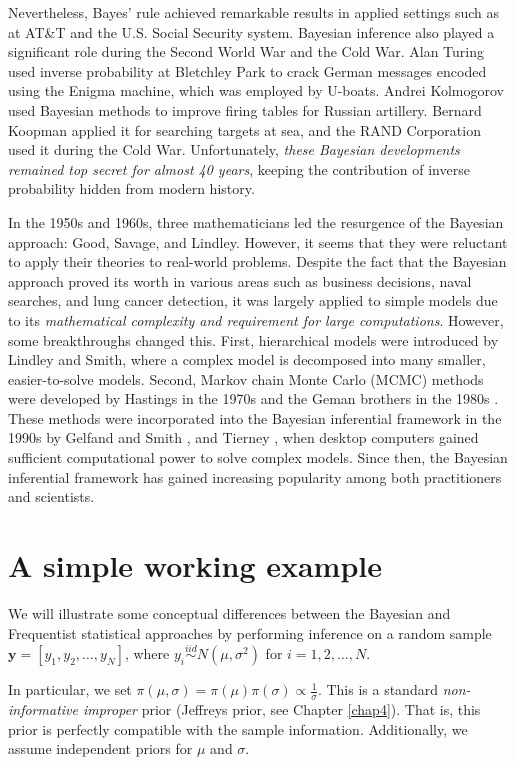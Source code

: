 Nevertheless, Bayes' rule achieved remarkable results in applied settings such as at AT\&T and the U.S. Social Security system. Bayesian inference also played a significant role during the Second World War and the Cold War. Alan Turing used inverse probability at Bletchley Park to crack German messages encoded using the Enigma machine, which was employed by U-boats. Andrei Kolmogorov used Bayesian methods to improve firing tables for Russian artillery. Bernard Koopman applied it for searching targets at sea, and the RAND Corporation used it during the Cold War. Unfortunately, \textit{these Bayesian developments remained top secret for almost 40 years}, keeping the contribution of inverse probability hidden from modern history.

In the 1950s and 1960s, three mathematicians led the resurgence of the Bayesian approach: Good, Savage, and Lindley. However, it seems that they were reluctant to apply their theories to real-world problems. Despite the fact that the Bayesian approach proved its worth in various areas such as business decisions, naval searches, and lung cancer detection, it was largely applied to simple models due to its \textit{mathematical complexity and requirement for large computations}. However, some breakthroughs changed this. First, hierarchical models were introduced by Lindley and Smith, where a complex model is decomposed into many smaller, easier-to-solve models. Second, Markov chain Monte Carlo (MCMC) methods were developed by Hastings in the 1970s \cite{hastings70} and the Geman brothers in the 1980s \cite{Geman1984}. These methods were incorporated into the Bayesian inferential framework in the 1990s by Gelfand and Smith \cite{Gelfand1990}, and Tierney \cite{tierney1994markov}, when desktop computers gained sufficient computational power to solve complex models. Since then, the Bayesian inferential framework has gained increasing popularity among both practitioners and scientists.

\section{A simple working example}\label{sec26}

We will illustrate some conceptual differences between the Bayesian and Frequentist statistical approaches by performing inference on a random sample $\mathbf{y} = [y_1, y_2, \dots, y_N]$, where $y_i \stackrel{iid}{\sim} N(\mu, \sigma^2)$ for $i = 1, 2, \dots, N$.

In particular, we set $\pi(\mu, \sigma) = \pi(\mu) \pi(\sigma) \propto \frac{1}{\sigma}$. This is a standard \textit{non-informative improper} prior (Jeffreys prior, see Chapter \ref{chap4}). That is, this prior is perfectly compatible with the sample information. Additionally, we assume independent priors for $\mu$ and $\sigma$.

